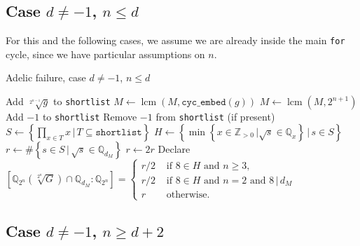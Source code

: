 \documentclass[10pt,a4paper]{article}
\DeclareMathOperator{\lcm}{lcm}
\theoremstyle{definition}
\begin{document}
\subsection{Case $d\neq -1$, $n\leq d$}
For this and the following cases, we assume we are already inside the main \texttt{for} cycle, since we have particular assumptions on $n$.
\begin{algorithm}
\caption{Adelic failure, case $d\neq -1$, $n\leq d$}
\begin{algorithmic}
\State Add $\sqrt[2^{n-1}]{g}$ to \texttt{shortlist}
\State $M\leftarrow\lcm(M,\texttt{cyc\_embed}(g))$
\EndFor
\State
\State $M\leftarrow\lcm(M,2^{n+1})$
\State
{}
\State Add $-1$ to \texttt{shortlist}
\EndIf
\State
{}
\State Remove $-1$ from \texttt{shortlist} (if present)
\EndIf
\State
{}
\State $S\leftarrow\left\{\prod_{x\in T}x\,|\,T\subseteq\texttt{shortlist}\right\}$
\State $H\leftarrow\left\{\min\left\{x\in\mathbb{Z}_{>0}\,|\sqrt{s}\in \mathbb{Q}_x\right\}\,|\,s\in S\right\}$
\State $r\leftarrow\# \left\{s\in S\,|\, \sqrt{s}\in\mathbb{Q}_{d_M}\right\}$
\State
{}
\State $r\leftarrow 2r$
\EndIf
\State Declare $\left[\mathbb{Q}_{2^n}\left(\sqrt[2^n]{G}\right)\cap \mathbb{Q}_{d_M}:\mathbb{Q}_{2^n}\right]=\begin{cases}
r/2&\text{ if }8\in H\text{ and }n\geq 3,\\
r/2&\text{ if }8\in H\text{ and }n=2\text{ and }8\,|\,d_M\\
r&\text{ otherwise}.
\end{cases}$
\EndFor
\end{algorithmic}

\end{algorithm}


\pagebreak
\subsection{Case $d\neq -1$, $n\geq d+2$}
\end{document}
